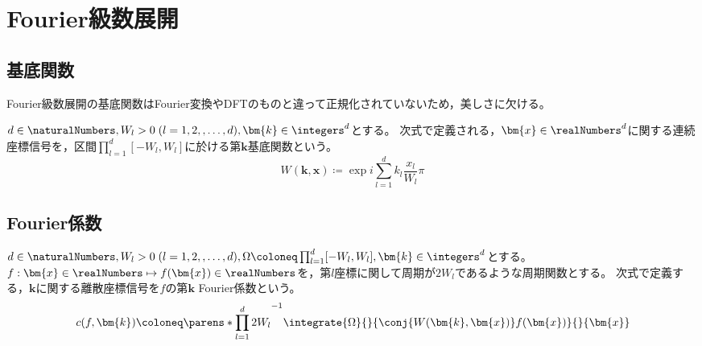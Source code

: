 \chapter{Fourier級数展開}
    \section{基底関数}
        Fourier級数展開の基底関数はFourier変換やDFTのものと違って正規化されていないため，美しさに欠ける。
        \par
        $d\in\naturalNumbers,W_l>0\;(l=1,2,,\dots,d),\bm{k}\in\integers^d$とする。
        次式で定義される，$\bm{x}\in\realNumbers^d$に関する連続座標信号を，区間$\prod_{l=1}^d [-W_l,W_l]$に於ける第$\bm{k}$基底関数という。
        \[ W(\bm{k},\bm{x}) \coloneq \exp i\sum_{l=1}^d k_l\frac{x_l}{W_l}\pi \]

    \section{Fourier係数}
        $d\in\naturalNumbers,W_l>0\;(l=1,2,,\dots,d),\Omega\coloneq\prod_{l=1}^d [-W_l,W_l],\bm{k}\in\integers^d$とする。
        $f:\bm{x}\in\realNumbers \mapsto f(\bm{x})\in\realNumbers$を，第$l$座標に関して周期が$2W_l$であるような周期関数とする。
        次式で定義する，$\bm{k}$に関する離散座標信号を$f$の第$\bm{k}$ Fourier係数という。
        \[ c(f,\bm{k}) \coloneq \parens*{\prod_{l=1}^d 2W_l}^{-1}\integrate{\Omega}{}{\conj{W(\bm{k},\bm{x})}f(\bm{x})}{}{\bm{x}} \]